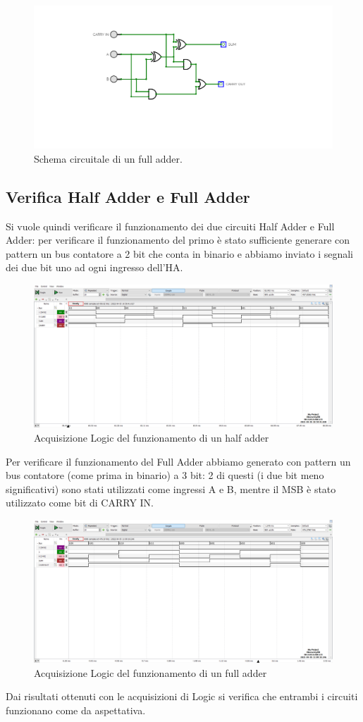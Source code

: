 \documentclass[10pt, a4paper, italian]{article}
\begin{document}
\begin{figure}[htbp]
    \centering
    \includegraphics[width=0.6\linewidth]{full.png}
    \caption{Schema circuitale di un full adder.}
    \label{fig:fulladder}
\end{figure}
\subsection{Verifica Half Adder e Full Adder}
Si vuole quindi verificare il funzionamento dei due circuiti Half Adder e Full Adder:
per verificare il funzionamento del primo è stato sufficiente generare con pattern
un bus contatore a 2 bit che conta in binario e abbiamo inviato i segnali dei due bit uno ad ogni ingresso dell'HA.
\begin{figure}[htbp]
	\centering
	\includegraphics[width=\textwidth]{half_time}
	\caption{Acquisizione Logic del funzionamento di un half adder}
\end{figure}
Per verificare il funzionamento del Full Adder abbiamo generato con pattern un bus
contatore (come prima in binario) a 3 bit: 2 di questi (i due bit meno significativi) sono stati utilizzati come ingressi A e B, mentre il MSB è stato utilizzato come bit di CARRY IN.
\begin{figure}[htbp]
	\centering
	\includegraphics[width=\textwidth]{full_time}
	\caption{Acquisizione Logic del funzionamento di un full adder}
\end{figure} 
Dai risultati ottenuti con le acquisizioni di Logic si verifica che entrambi i circuiti funzionano come da aspettativa.
\end{document}
